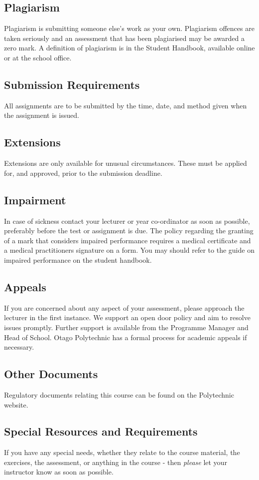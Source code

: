 \documentclass{article}
\begin{document}
\subsection*{Plagiarism}
Plagiarism is submitting someone else's work as your own.  Plagiarism offences are taken seriously and an
assessment that has been plagiarised may be awarded a zero mark.  A definition of plagiarism is in the Student Handbook,
available online or at the school office.

\subsection*{Submission Requirements}
All assignments are to be submitted by the time, date, and method given when the assignment is issued.

\subsection*{Extensions}
Extensions are only available for unusual circumstances.  These must be applied for, and approved, prior to the submission deadline.

\subsection*{Impairment}
In case of sickness contact your lecturer or year co-ordinator as soon as possible, preferably before the test or
assignment is due.  The policy regarding the granting of a mark that considers impaired performance requires a medical
certificate and a medical practitioners signature on a form. You may should refer to the guide on impaired performance
on the student handbook.

\subsection*{Appeals}
If you are concerned about any aspect of your assessment, please approach the lecturer in the first instance.  We support
an open door policy and aim to resolve issues promptly.  Further support is available from the Programme
Manager and Head of School. Otago Polytechnic has a formal process for academic appeals if necessary.

\subsection*{Other Documents}
Regulatory documents relating this course can be found on the Polytechnic website.

\subsection*{Special Resources and Requirements}
If you have any special needs, whether they relate to the course material, the exercises, the assessment, or anything in the course -
then \textit{please} let your instructor know as soon as possible.
\end{document}

